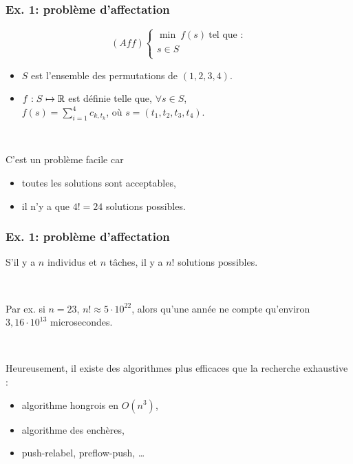 \documentclass{beamer}
\newcommand{\R}{{\ensuremath\mathbb{R}}}
\begin{document}
\begin{frame}
  \frametitle{Ex. 1: problème d'affectation}

  \[
  (Aff) \left\{
  \begin{array}{c}
    \min \ f(s) \ \text{tel que :} \\
    s \in S \\
  \end{array}
  \right.
  \]

  \begin{itemize}
  \item $S$ est l'ensemble des permutations de $(1,2,3,4)$. 
  \item $f : S \mapsto \R$ est définie telle que, $\forall s \in S$, \\
    $f(s) = \sum_{i=1}^4 c_{k,t_k}$, où $s = (t_1,t_2,t_3,t_4)$.  
  \end{itemize}

  ~
  
  C'est un problème facile car
  \begin{itemize}
  \item toutes les solutions sont acceptables,
  \item il n'y a que $4! = 24$ solutions possibles. 
  \end{itemize}

\end{frame}

\begin{frame}
  \frametitle{Ex. 1: problème d'affectation}

  S'il y a $n$ individus et $n$ tâches,
  il y a $n!$ solutions possibles. 

  ~
  
  Par ex. si $n = 23$, $n! \approx 5 \cdot 10^{22}$, alors qu'une
  année ne compte qu'environ $3,16 \cdot 10^{13}$ microsecondes.

  ~
  
  Heureusement, il existe des algorithmes plus efficaces
  que la recherche exhaustive :
  \begin{itemize}
  \item algorithme hongrois en $O(n^3)$,
  \item algorithme des enchères,
  \item push-relabel, preflow-push, \dots
  \end{itemize}
  
\end{frame}
\end{document}

